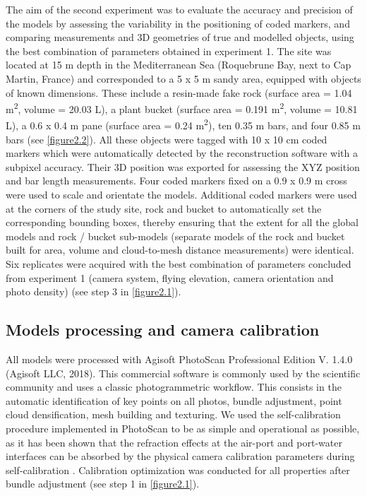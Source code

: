 The aim of the second experiment was to evaluate the accuracy and precision of the models by assessing the variability in the positioning of coded markers, and comparing measurements and 3D geometries of true and modelled objects, using the best combination of parameters obtained in experiment 1. The site was located at 15 m depth in the Mediterranean Sea (Roquebrune Bay, next to Cap Martin, France) and corresponded to a 5 x 5 m sandy area, equipped with objects of known dimensions. These include a resin-made fake rock (surface area = 1.04 m\textsuperscript{2}, volume = 20.03 L), a plant bucket (surface area = 0.191 m\textsuperscript{2}, volume = 10.81 L), a 0.6 x 0.4 m pane (surface area = 0.24 m\textsuperscript{2}), ten 0.35 m bars, and four 0.85 m bars (see \autoref{figure2.2}). All these objects were tagged with 10 x 10 cm coded markers which were automatically detected by the reconstruction software with a subpixel accuracy. Their 3D position was exported for assessing the XYZ position and bar length measurements. Four coded markers fixed on a 0.9 x 0.9 m cross were used to scale and orientate the models. Additional coded markers were used at the corners of the study site, rock and bucket to automatically set the corresponding bounding boxes, thereby ensuring that the extent for all the global models and rock / bucket sub-models (separate models of the rock and bucket built for area, volume and cloud-to-mesh distance measurements) were identical. Six replicates were acquired with the best combination of parameters concluded from experiment 1 (camera system, flying elevation, camera orientation and photo density) (see step 3 in \autoref{figure2.1}).

\subsection{Models processing and camera calibration}\label{chapitre2_2.2}
All models were processed with Agisoft PhotoScan Professional Edition V. 1.4.0 (Agisoft LLC, 2018). This commercial software is commonly used by the scientific community \citep{burns_integrating_2015, burns_utilizing_2015, figueira_accuracy_2015, burns_assessing_2016, guo_accuracy_2016,   casella_mapping_2017, mizuno_simple_2017} and uses a classic photogrammetric workflow. This consists in the automatic identification of key points on all photos, bundle adjustment, point cloud densification, mesh building and texturing. We used the self-calibration procedure implemented in PhotoScan to be as simple and operational as possible, as it has been shown that the refraction effects at the air-port and port-water interfaces can be absorbed by the physical camera calibration parameters during self-calibration \citep{shortis_calibration_2015}. Calibration optimization was conducted for all properties after bundle adjustment (see step 1 in \autoref{figure2.1}).

